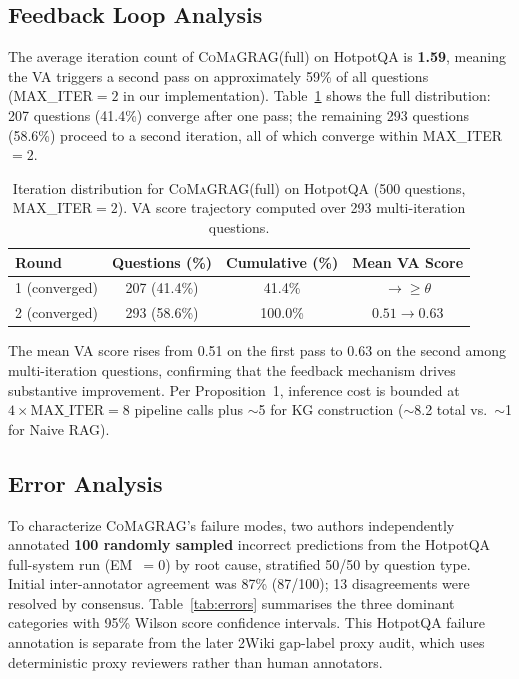 \documentclass[runningheads]{llncs}
\newcommand{\sys}{\textsc{CoMaGRAG}\xspace}
\begin{document}
\subsection{Feedback Loop Analysis}

The average iteration count of \sys (full) on HotpotQA is \textbf{1.59},
meaning the VA triggers a second pass on approximately 59\% of all questions
(MAX\_ITER$=2$ in our implementation). Table~\ref{tab:iters} shows the
full distribution: 207 questions (41.4\%) converge after one pass; the
remaining 293 questions (58.6\%) proceed to a second iteration, all of which
converge within MAX\_ITER$=2$.

\begin{table}[t]
\centering
\caption{Iteration distribution for \sys (full) on HotpotQA (500 questions,
MAX\_ITER$=2$). VA score trajectory computed over 293 multi-iteration questions.}
\label{tab:iters}
\begin{tabular}{lccc}
\toprule
Round & Questions (\%) & Cumulative (\%) & Mean VA Score \\
\midrule
1 (converged)  & 207 (41.4\%) & 41.4\%  & $\to\geq\theta$ \\
2 (converged)  & 293 (58.6\%) & 100.0\% & $0.51\to0.63$ \\
\bottomrule
\end{tabular}
\end{table}

The mean VA score rises from 0.51 on the first pass to 0.63 on the second
among multi-iteration questions, confirming that the feedback mechanism drives
substantive improvement. Per Proposition~1, inference cost is bounded at
$4\times\text{MAX\_ITER}=8$ pipeline calls plus $\sim$5 for KG construction
($\sim$8.2 total vs.\ $\sim$1 for Naive RAG).

\subsection{Error Analysis}
\label{sec:error}

To characterize \sys's failure modes, two authors independently annotated
\textbf{100 randomly sampled} incorrect predictions from the HotpotQA
full-system run (EM~$=0$) by root cause, stratified 50/50 by question type.
Initial inter-annotator agreement was 87\% (87/100); 13 disagreements were
resolved by consensus. Table~\ref{tab:errors} summarises the three dominant
categories with 95\% Wilson score confidence intervals.
This HotpotQA failure annotation is separate from the later 2Wiki gap-label
proxy audit, which uses deterministic proxy reviewers rather than human
annotators.
\end{document}
